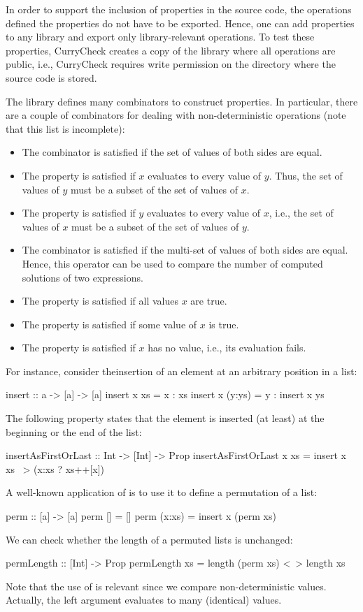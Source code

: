 In order to support the inclusion of properties in the source code,
the operations defined the properties do not have to be exported.
Hence, one can add properties to any library and export only
library-relevant operations. To test these properties,
CurryCheck creates a copy of the library where all operations
are public, i.e., CurryCheck requires write permission on the
directory where the source code is stored.

The library  defines many combinators
to construct properties. In particular, there are a couple of
combinators for dealing with non-deterministic operations
(note that this list is incomplete):
\begin{itemize}
\item
The combinator  is satisfied if the set of values
of both sides are equal.
\item
The property  is satisfied if $x$
evaluates to every value of $y$.
Thus, the set of values of $y$ must be a subset of the set of values of $x$.
\item
The property  is satisfied if $y$
evaluates to every value of $x$, i.e.,
the set of values of $x$ must be a subset of the set of values of $y$.
\item
The combinator  is satisfied
if the multi-set of values of both sides are equal.
Hence, this operator can be used to compare the number
of computed solutions of two expressions.
\item
The property  is satisfied if all values $x$ are true.
\item
The property  is satisfied if some value
of $x$ is true.
\item
The property  is satisfied if $x$ has no value,
i.e., its evaluation fails.
\end{itemize}
%
For instance, consider theinsertion of an element at an arbitrary
position in a list:
\begin{curry}
insert :: a -> [a] -> [a]
insert x xs     = x : xs
insert x (y:ys) = y : insert x ys
\end{curry}
The following property states that the element is inserted
(at least) at the beginning or the end of the list:
\begin{curry}
insertAsFirstOrLast :: Int -> [Int] -> Prop
insertAsFirstOrLast x xs = insert x xs ~> (x:xs ? xs++[x])
\end{curry}
%
A well-known application of  is to use it to define
a permutation of a list:
\begin{curry}
perm :: [a] -> [a]
perm []     = []
perm (x:xs) = insert x (perm xs)
\end{curry}
We can check whether the length of a permuted lists is unchanged:
\begin{curry}
permLength :: [Int] -> Prop
permLength xs = length (perm xs) <~> length xs
\end{curry}
Note that the use of  is relevant since
we compare non-deterministic values. Actually, the left argument
evaluates to many (identical) values.

